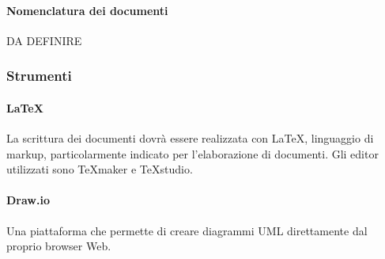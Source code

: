 \paragraph*{Nomenclatura dei documenti}
DA DEFINIRE

\subsubsection{Strumenti}

\paragraph{\LaTeX}
La scrittura dei documenti dovrà essere realizzata con \LaTeX ,  linguaggio di markup,  particolarmente  indicato  per  l'elaborazione  di  documenti.
Gli editor utilizzati sono \TeX maker e \TeX studio.

\paragraph{Draw.io}
Una piattaforma che permette di creare diagrammi UML direttamente dal proprio browser Web.


